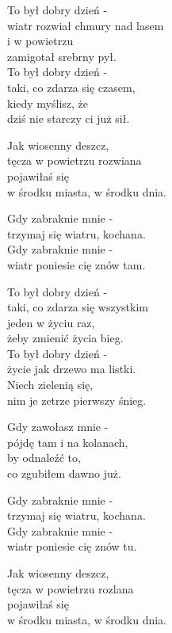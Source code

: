 \begin{text}
    \begin{scriptTwelve}
    To był dobry dzień -\\
    wiatr rozwiał chmury nad lasem\\
    i w powietrzu\\
    zamigotał srebrny pył.\\
    To był dobry dzień -\\
    taki, co zdarza się czasem,\\
    kiedy myślisz, że\\
    dziś nie starczy ci już sił.

    Jak wiosenny deszcz,\\
    tęcza w powietrzu rozwiana\\
    pojawiłaś się\\
    w środku miasta, w środku dnia.

    Gdy zabraknie mnie -\\
    trzymaj się wiatru, kochana.\\
    Gdy zabraknie mnie -\\
    wiatr poniesie cię znów tam.

    To był dobry dzień -\\
    taki, co zdarza się wszystkim\\
    jeden w życiu raz,\\
    żeby zmienić życia bieg.\\
    To był dobry dzień -\\
    życie jak drzewo ma listki.\\
    Niech zielenią się,\\
    nim je zetrze pierwszy śnieg.

    Gdy zawołasz mnie -\\
    pójdę tam i na kolanach,\\
    by odnaleźć to,\\
    co zgubiłem dawno już.

    Gdy zabraknie mnie -\\
    trzymaj się wiatru, kochana.\\
    Gdy zabraknie mnie -\\
    wiatr poniesie cię znów tu.

    Jak wiosenny deszcz,\\
    tęcza w powietrzu rozlana\\
    pojawiłaś się\\
    w środku miasta, w środku dnia.


\end{scriptTwelve}
\end{text}
